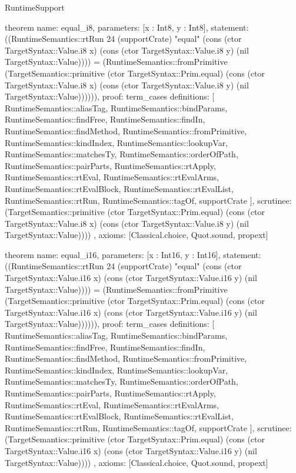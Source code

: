 \begin{lexlean}{RuntimeSupport}
\begin{semanticmodule}
theorem{
  name: equal_i8,
  parameters: [x : Int8, y : Int8],
  statement: ((RuntimeSemantics::rtRun 24 (supportCrate) "equal" (cons (ctor TargetSyntax::Value.i8 x) (cons (ctor TargetSyntax::Value.i8 y) (nil TargetSyntax::Value)))) = (RuntimeSemantics::fromPrimitive (TargetSemantics::primitive (ctor TargetSyntax::Prim.equal) (cons (ctor TargetSyntax::Value.i8 x) (cons (ctor TargetSyntax::Value.i8 y) (nil TargetSyntax::Value)))))),
  proof: term_cases{
    definitions: [
      RuntimeSemantics::aliasTag,
      RuntimeSemantics::bindParams,
      RuntimeSemantics::findFree,
      RuntimeSemantics::findIn,
      RuntimeSemantics::findMethod,
      RuntimeSemantics::fromPrimitive,
      RuntimeSemantics::kindIndex,
      RuntimeSemantics::lookupVar,
      RuntimeSemantics::matchesTy,
      RuntimeSemantics::orderOfPath,
      RuntimeSemantics::pairParts,
      RuntimeSemantics::rtApply,
      RuntimeSemantics::rtEval,
      RuntimeSemantics::rtEvalArms,
      RuntimeSemantics::rtEvalBlock,
      RuntimeSemantics::rtEvalList,
      RuntimeSemantics::rtRun,
      RuntimeSemantics::tagOf,
      supportCrate
    ],
    scrutinee: (TargetSemantics::primitive (ctor TargetSyntax::Prim.equal) (cons (ctor TargetSyntax::Value.i8 x) (cons (ctor TargetSyntax::Value.i8 y) (nil TargetSyntax::Value))))
  },
  axioms: [Classical.choice, Quot.sound, propext]
}

theorem{
  name: equal_i16,
  parameters: [x : Int16, y : Int16],
  statement: ((RuntimeSemantics::rtRun 24 (supportCrate) "equal" (cons (ctor TargetSyntax::Value.i16 x) (cons (ctor TargetSyntax::Value.i16 y) (nil TargetSyntax::Value)))) = (RuntimeSemantics::fromPrimitive (TargetSemantics::primitive (ctor TargetSyntax::Prim.equal) (cons (ctor TargetSyntax::Value.i16 x) (cons (ctor TargetSyntax::Value.i16 y) (nil TargetSyntax::Value)))))),
  proof: term_cases{
    definitions: [
      RuntimeSemantics::aliasTag,
      RuntimeSemantics::bindParams,
      RuntimeSemantics::findFree,
      RuntimeSemantics::findIn,
      RuntimeSemantics::findMethod,
      RuntimeSemantics::fromPrimitive,
      RuntimeSemantics::kindIndex,
      RuntimeSemantics::lookupVar,
      RuntimeSemantics::matchesTy,
      RuntimeSemantics::orderOfPath,
      RuntimeSemantics::pairParts,
      RuntimeSemantics::rtApply,
      RuntimeSemantics::rtEval,
      RuntimeSemantics::rtEvalArms,
      RuntimeSemantics::rtEvalBlock,
      RuntimeSemantics::rtEvalList,
      RuntimeSemantics::rtRun,
      RuntimeSemantics::tagOf,
      supportCrate
    ],
    scrutinee: (TargetSemantics::primitive (ctor TargetSyntax::Prim.equal) (cons (ctor TargetSyntax::Value.i16 x) (cons (ctor TargetSyntax::Value.i16 y) (nil TargetSyntax::Value))))
  },
  axioms: [Classical.choice, Quot.sound, propext]
}


\end{semanticmodule}
\end{lexlean}

